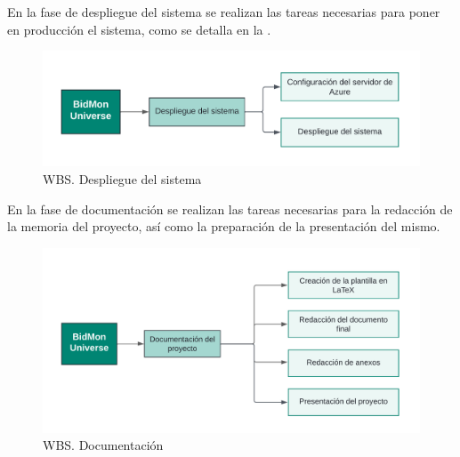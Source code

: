 En la fase de despliegue del sistema se realizan las tareas necesarias para poner en producción el sistema, como se detalla en la .
\begin{figure}[H]
    \hypertarget{fig:5_WBS-Despliegue}{}
    \centering
    \includegraphics[width=0.9\linewidth]{figures/5-WBS/5_WBS-Despliegue2.png}
    \caption{WBS. Despliegue del sistema}
    \label{fig:5_WBS-Despliegue}
\end{figure}

En la fase de documentación se realizan las tareas necesarias para la redacción de la memoria del proyecto, así como la preparación de la presentación del mismo.
\begin{figure}[H]
    \hypertarget{fig:5_WBS-Documentacion}{}
    \centering
    \includegraphics[width=0.9\linewidth]{figures/5-WBS/5_WBS-Documentacion.png}
    \caption{WBS. Documentación}
    \label{fig:5_WBS-Documentacion}
\end{figure}
